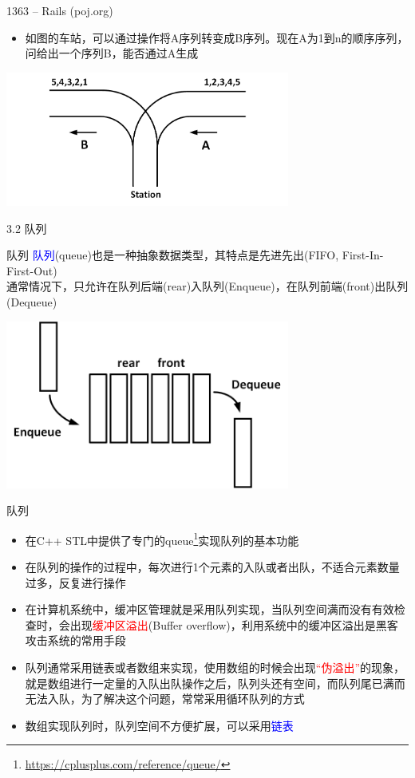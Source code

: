 \begin{frame}{1363 -- Rails (poj.org)}
    \begin{itemize}
        \item 如图的车站，可以通过操作将A序列转变成B序列。现在A为1到n的顺序序列，问给出一个序列B，能否通过A生成
    \end{itemize}
    \vfill
    \includegraphics[width=0.7\textwidth,center]{fig/3-2.png}
\end{frame}
\begin{frame}{3.2 队列}
    \begin{block}{队列}
        \textcolor{blue}{队列}(queue)也是一种抽象数据类型，其特点是先进先出(FIFO, First-In-First-Out) \\ 通常情况下，只允许在队列后端(rear)入队列(Enqueue)，在队列前端(front)出队列(Dequeue)
    \end{block}
    \vfill
    \includegraphics[width=0.7\textwidth,center]{fig/3-3.png}
\end{frame}
\begin{frame}{队列}
    \begin{itemize}
        \item 在C++ STL中提供了专门的queue\footnote{\url{https://cplusplus.com/reference/queue/}}实现队列的基本功能
        \item 在队列的操作的过程中，每次进行1个元素的入队或者出队，不适合元素数量过多，反复进行操作
        \item 在计算机系统中，缓冲区管理就是采用队列实现，当队列空间满而没有有效检查时，会出现\textcolor{red}{缓冲区溢出}(Buffer overflow)，利用系统中的缓冲区溢出是黑客攻击系统的常用手段
        \item 队列通常采用链表或者数组来实现，使用数组的时候会出现\textcolor{red}{“伪溢出”}的现象，就是数组进行一定量的入队出队操作之后，队列头还有空间，而队列尾已满而无法入队，为了解决这个问题，常常采用循环队列的方式
        \item 数组实现队列时，队列空间不方便扩展，可以采用\textcolor{blue}{链表}
    \end{itemize}
\end{frame}    

